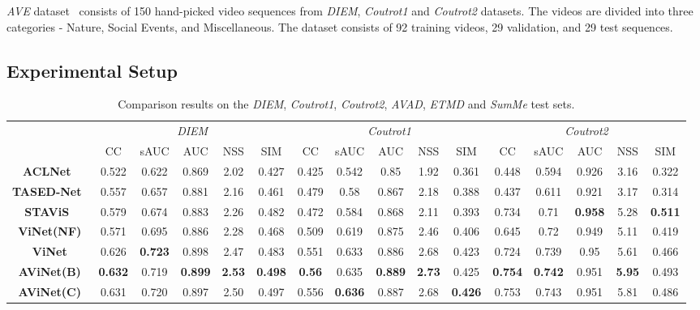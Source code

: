 \documentclass[letterpaper, 10 pt, conference]{ieeeconf}  \usepackage{times}
\begin{document}
\emph{AVE} dataset~\cite{tavakoli2019dave} consists of 150 hand-picked video sequences from \emph{DIEM}, \emph{Coutrot1} and \emph{Coutrot2} datasets. The videos are divided into three categories - Nature, Social Events, and Miscellaneous. The dataset consists of 92 training videos, 29 validation, and 29 test sequences.

\subsection{Experimental Setup}
\label{subsec:Expsetup}

\begin{table*}[t]
\caption{Comparison results on the \emph{DIEM}, \emph{Coutrot1}, \emph{Coutrot2}, \emph{AVAD}, \emph{ETMD} and \emph{SumMe} test sets.}
\footnotesize
\begin{center}

\begin{tabular}{|c|ccccc|ccccc|ccccc|}
\hline
 & \multicolumn{5}{c|}{\emph{DIEM}} & \multicolumn{5}{c|}{\emph{Coutrot1}} & \multicolumn{5}{c|}{\emph{Coutrot2}} \\
 & CC & sAUC & AUC & NSS & SIM & CC & sAUC & AUC & NSS & SIM & CC & sAUC & AUC & NSS & SIM \\ 
 \hline\hline
\textbf{ACLNet}~\cite{wang2019revisiting} & 0.522 & 0.622 & 0.869 & 2.02 & 0.427 & 0.425 & 0.542 & 0.85 & 1.92 & 0.361 & 0.448 & 0.594 & 0.926 & 3.16 & 0.322 \\
\textbf{TASED-Net}~\cite{min2019tased} & 0.557 & 0.657 & 0.881 & 2.16 & 0.461 & 0.479 & 0.58 & 0.867 & 2.18 & 0.388 & 0.437 & 0.611 & 0.921 & 3.17 & 0.314 \\
\textbf{STAViS}~\cite{tsiami2020stavis} & 0.579 & 0.674 & 0.883 & 2.26 & 0.482 & 0.472 & 0.584 & 0.868 & 2.11 & 0.393 & 0.734 & 0.71 & \textbf{0.958} & 5.28 & \textbf{0.511} \\
\hline
\textbf{ViNet(NF)} & 0.571 & 0.695 & 0.886 & 2.28 & 0.468 & 0.509 & 0.619 & 0.875 & 2.46 & 0.406 & 0.645 & 0.72 & 0.949 & 5.11 & 0.419 \\
\textbf{ViNet} & 0.626 & \textbf{0.723} & 0.898 & 2.47 & 0.483 & 0.551 & 0.633 & 0.886 & 2.68 & 0.423 & 0.724 & 0.739 & 0.95 & 5.61 & 0.466 \\
\textbf{AViNet(B)} & \textbf{0.632} & 0.719 & \textbf{0.899} & \textbf{2.53} & \textbf{0.498} & \textbf{0.56} & 0.635 & \textbf{0.889} & \textbf{2.73} & 0.425 & \textbf{0.754} & \textbf{0.742} & 0.951 & \textbf{5.95} & 0.493 \\ 
\textbf{AViNet(C)} & 0.631&	0.720&	0.897&	2.50&	0.497 &0.556&	\textbf{0.636}&	0.887&	2.68&	\textbf{0.426} & 0.753&	0.743&	0.951&	5.81&	0.486 \\ \hline
\end{tabular}


\end{center}
\end{table*}
\end{document}
